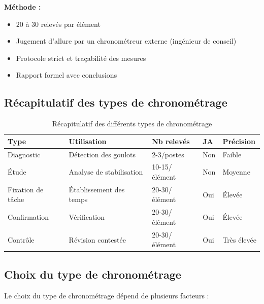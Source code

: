 \documentclass[a4paper,12pt]{article}
\begin{document}
\textbf{Méthode :}
\begin{itemize}
    \item 20 à 30 relevés par élément
    \item Jugement d'allure par un chronométreur externe (ingénieur de conseil)
    \item Protocole strict et traçabilité des mesures
    \item Rapport formel avec conclusions
\end{itemize}

\subsection{Récapitulatif des types de chronométrage}

\begin{table}[ht]
\centering
\begin{tabular}{|p{3.5cm}|p{3.5cm}|p{2.5cm}|p{2.5cm}|p{2.5cm}|}
\hline
\textbf{Type} & \textbf{Utilisation} & \textbf{Nb relevés} & \textbf{JA} & \textbf{Précision} \\
\hline
Diagnostic & Détection des goulots & 2-3/postes & Non & Faible \\
Étude & Analyse de stabilisation & 10-15/élément & Non & Moyenne \\
Fixation de tâche & Établissement des temps & 20-30/élément & Oui & Élevée \\
Confirmation & Vérification & 20-30/élément & Oui & Élevée \\
Contrôle & Révision contestée & 20-30/élément & Oui & Très élevée \\
\hline
\end{tabular}
\caption{Récapitulatif des différents types de chronométrage}
\end{table}

\subsection{Choix du type de chronométrage}

Le choix du type de chronométrage dépend de plusieurs facteurs :
\end{document}
